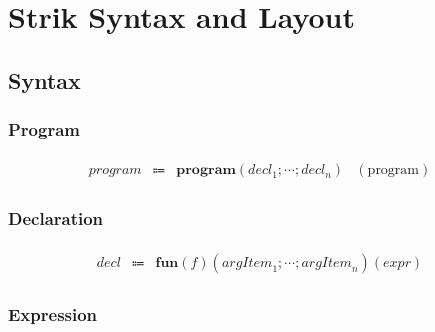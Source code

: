 \section{Strik Syntax and Layout}

\subsection{Syntax}

\subsubsection{Program}

\begin{align*}
  \begin{array}{rclr}
    \mathit{program}
    & \Coloneq & \mathbf{program}(\mathit{decl}_1; \cdots; \mathit{decl}_n) &(\text{program})
  \end{array}
\end{align*}

\subsubsection{Declaration}

\begin{align*}
  \begin{array}{rclr}
    \mathit{decl}
    & \Coloneq & \mathbf{fun}(f)(\mathit{argItem}_1; \cdots; \mathit{argItem}_n)(\mathit{expr})
  \end{array}
\end{align*}

\subsubsection{Expression}

